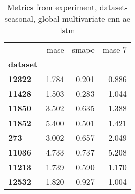 \begin{table}[h]
\centering
\caption{Metrics from experiment, dataset-seasonal, global multivariate cnn ae lstm}
\label{table:global-multivariate-cnn-ae-lstm-dataset-seasonal}
\begin{tabular}{lrrr}
\toprule
{} &   mase &  smape &  mase-7 \\
\textbf{dataset} &        &        &         \\
\midrule
\textbf{12322  } &  1.784 &  0.201 &   0.886 \\
\textbf{11428  } &  1.503 &  0.283 &   1.044 \\
\textbf{11850  } &  3.502 &  0.635 &   1.388 \\
\textbf{11852  } &  5.400 &  0.501 &   1.421 \\
\textbf{273    } &  3.002 &  0.657 &   2.049 \\
\textbf{11036  } &  4.733 &  0.737 &   5.208 \\
\textbf{11213  } &  1.739 &  0.590 &   1.170 \\
\textbf{12532  } &  1.820 &  0.927 &   1.004 \\
\bottomrule
\end{tabular}
\end{table}
